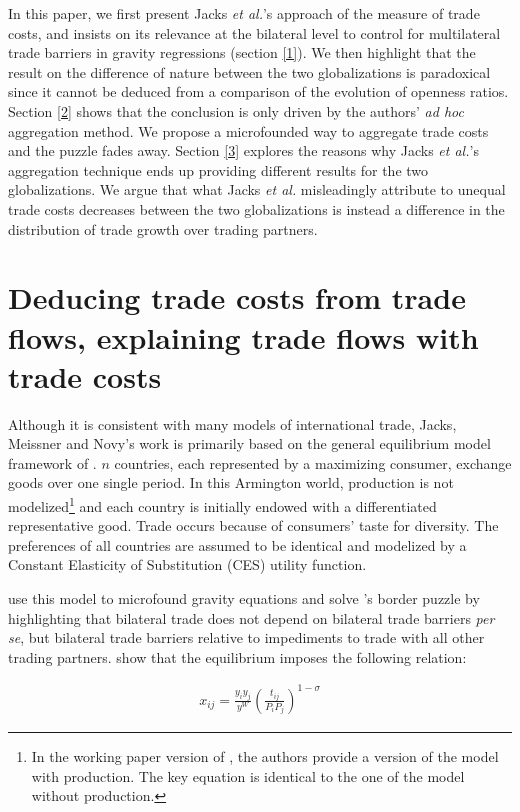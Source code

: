 \documentclass{article}
\begin{document}
In this paper, we first present Jacks \textit{et al.}'s approach of the
measure of trade costs, and insists on its relevance at the
bilateral level to control for multilateral trade barriers in
gravity regressions (section \ref{1}). We then highlight that the
result on the difference of nature between the two globalizations
is paradoxical since it cannot be deduced from a comparison of the
evolution of openness ratios. Section \ref{2} shows that the
conclusion is only driven by the authors' \textit{ad hoc} aggregation
method. We propose a microfounded way to aggregate trade costs
and the puzzle fades away. Section \ref{3} explores the reasons
why Jacks \textit{et al.}'s aggregation technique ends up providing
different results for the two globalizations. We argue that
what Jacks \textit{et al.} misleadingly attribute to unequal trade costs
decreases between the two globalizations is instead a
difference in the distribution of trade growth over trading
partners.

\section{\label{1} Deducing trade costs from trade flows, explaining trade flows with trade costs}

Although it is consistent with many models of international
trade, Jacks, Meissner and Novy's work is primarily based on
the general equilibrium model framework of \cite{AW2003}. $n$
countries, each represented by a maximizing consumer, exchange
goods over one single period. In this Armington world,
production is not modelized\footnote{In the working paper
version of \cite{JMN2010}, the authors provide a version of the
model with production. The key equation is identical to the one
of the model without production.} and each country is initially
endowed with a differentiated representative good. Trade occurs
because of consumers' taste for diversity. The preferences of
all countries are assumed to be identical and modelized by a
Constant Elasticity of Substitution (CES) utility function.

\cite{AW2003} use this model to microfound gravity equations
and solve \cite{MAC}'s border puzzle by highlighting that
bilateral trade does not depend on bilateral trade barriers \textit{per
se}, but bilateral trade barriers relative to impediments to
trade with all other trading partners. \cite{AW2003} show that the
equilibrium imposes the following relation:

\begin{eqnarray}
x_{ij}=\frac{y_i y_j}{y^W}\left(\frac{t_{ij}}{P_i P_j}\right)^{1-\sigma}
\end{eqnarray}
\end{document}
